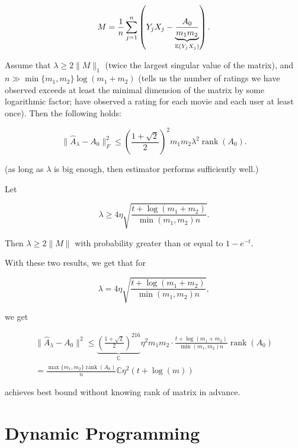 \begin{example}
\begin{theorem}
\[
M = \frac{1}{n} \sum_{j=1}^n \left(Y_j X_j - \underbrace{\frac{A_0}{m_1 m_2 }}_{\mathbb{E}(Y_j X_j)} \right).
\]

Assume that \(\lambda \geq 2 \lVert M \rVert_1\) (twice the largest singular value of the matrix), and \(n \gg \min\{m_1, m_2\} \log (m_1 + m_2)\) (tells us the number of ratings we have observed exceeds at least the minimal dimension of the matrix by some logarithmic factor; have observed a rating for each movie and each user at least once). Then the following holds:

\[
\lVert \hat{A}_\lambda - A_0 \rVert_F^2 \leq \left( \frac{1 + \sqrt{2}}{2} \right)^2m_1m_2 \lambda^2 \operatorname{rank}(A_0).
\]

(as long as \(\lambda\) is big enough, then estimator performs sufficiently well.)

\end{theorem}

\begin{proposition}

Let 

\[
\lambda \geq 4 \eta \sqrt{\frac{t + \log(m_1 + m_2)}{\min(m_1, m_2)n}}.
\]

Then \(\lambda \geq 2 \lVert M \rVert\) with probability greater than or equal to \(1 - e^{-t}\).

\end{proposition}


With these two results, we get that for

\[
\lambda = 4 \eta \sqrt{\frac{t + \log(m_1 + m_2)}{\min(m_1, m_2)n}},
\]

we get

\begin{multline*}
\lVert \hat{A}_\lambda - A_0 \rVert^2 \leq \underbrace{ \left( \frac{1 + \sqrt{2}}{2} \right)^216}_{\mathbb{C}} \eta^2 m_1m_2 \cdot \frac{t + \log(m_1 + m_2)}{\min(m_1, m_2)n}  \operatorname{rank}(A_0) 
\\ = \frac{\max\{m_1, m_2\} \operatorname{rank}(A_0)}{n} \mathbb{C} \eta^2(t + \log(m))
\end{multline*}

achieves best bound without knowing rank of matrix in advance. 

\end{example}


%
%
%
%
%
%
%
%
%
%

\section{Dynamic Programming}

